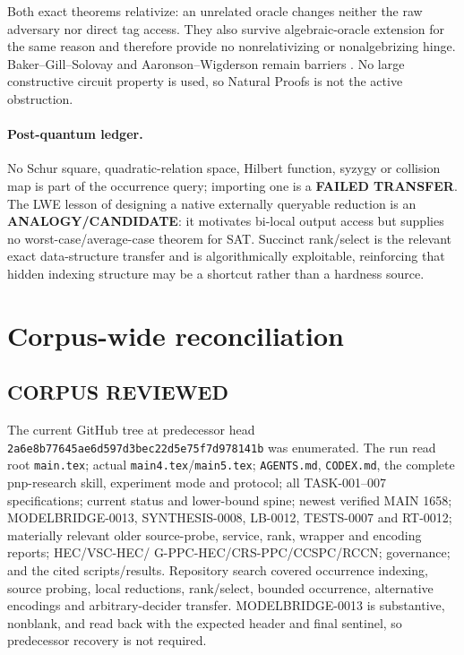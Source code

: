\documentclass[11pt]{article}
\begin{document}
Both exact theorems relativize: an unrelated oracle changes neither the
raw adversary nor direct tag access.  They also survive algebraic-oracle
extension for the same reason and therefore provide no nonrelativizing or
nonalgebrizing hinge.  Baker--Gill--Solovay and Aaronson--Wigderson remain
barriers \cite{bgs,aw}.  No large constructive circuit property is used, so
Natural Proofs is not the active obstruction.

\paragraph{Post-quantum ledger.}
No Schur square, quadratic-relation space, Hilbert function, syzygy or
collision map is part of the occurrence query; importing one is a
\textbf{FAILED TRANSFER}.  The LWE lesson of designing a native externally
queryable reduction is an \textbf{ANALOGY/CANDIDATE}: it motivates bi-local
output access but supplies no worst-case/average-case theorem for SAT.
Succinct rank/select is the relevant exact data-structure transfer and is
algorithmically exploitable, reinforcing that hidden indexing structure may
be a shortcut rather than a hardness source.

\section{Corpus-wide reconciliation}

\subsection*{CORPUS REVIEWED}
The current GitHub tree at predecessor head
\texttt{2a6e8b77645ae6d597d3bec22d5e75f7d978141b} was enumerated.  The run
read root \texttt{main.tex}; actual \texttt{main4.tex}/\texttt{main5.tex};
\texttt{AGENTS.md}, \texttt{CODEX.md}, the complete pnp-research skill,
experiment mode and protocol; all TASK-001--007 specifications; current
status and lower-bound spine; newest verified MAIN 1658; MODELBRIDGE-0013,
SYNTHESIS-0008, LB-0012, TESTS-0007 and RT-0012; materially relevant older
source-probe, service, rank, wrapper and encoding reports; HEC/VSC-HEC/
G-PPC-HEC/CRS-PPC/CCSPC/RCCN; governance; and the cited scripts/results.
Repository search covered occurrence indexing, source probing, local
reductions, rank/select, bounded occurrence, alternative encodings and
arbitrary-decider transfer.  MODELBRIDGE-0013 is substantive, nonblank, and
read back with the expected header and final sentinel, so predecessor
recovery is not required.
\end{document}
